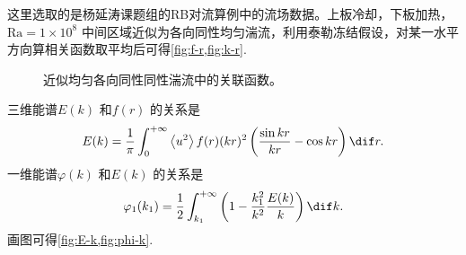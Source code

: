 \documentclass[12pt,a4]{ctexart}
\begin{document}
这里选取的是杨延涛课题组的RB对流算例中的流场数据。上板冷却，下板加热， $\mathrm{Ra} = 1 \times 10^{8}$ 中间区域近似为各向同性均匀湍流，利用泰勒冻结假设，对某一水平方向算相关函数取平均后可得\cref{fig:f-r,fig:k-r}.
\begin{figure}%
   \centering
   \quad
   \caption{近似均匀各向同性同性湍流中的关联函数。}
\end{figure}
三维能谱$E(k)$ 和$f(r)$ 的关系是
\begin{equation}
   E(k) = \frac{1}{\pi} \int_{0}^{+\infty} \left< u^2 \right> f(r) (kr)^{2} \left( \frac{\sin kr}{kr} - \cos kr \right) \dif r.
\end{equation}
一维能谱$\varphi(k)$ 和$E(k)$ 的关系是
\begin{equation}
   \varphi_1(k_1) = \frac{1}{2} \int_{k_1}^{+\infty} \left( 1 - \frac{k_1^2}{k^2} \frac{E(k)}{k}\right) \dif k.
\end{equation}
画图可得\cref{fig:E-k,fig:phi-k}.
\end{document}
